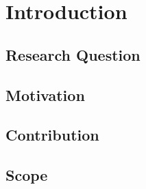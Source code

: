\section{Introduction}
\label{sec:introduction}


\subsection{Research Question}

\subsection{Motivation}

\subsection{Contribution}

\subsection{Scope}
